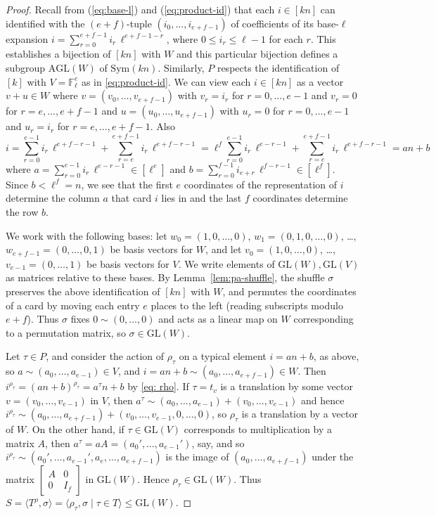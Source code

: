 \documentclass[12pt]{amsart}
\theoremstyle{remark}
\theoremstyle{definition}
\newcommand{\sym}{\mathrm{Sym}}
\newcommand{\GL}{\mathrm{GL}}
\newcommand{\AGL}{\mathrm{AGL}}
\begin{document}
\begin{proof}
Recall from (\ref{eq:base-l}) and (\ref{eq:product-id}) that each $i \in [kn]$ can identified with the $(e+f)$-tuple $(i_0, \ldots, i_{e+f-1})$ of coefficients of its base-$\ell$ expansion $i = \sum_{r=0}^{e+f-1} i_r\, \ell^{e+f-1-r}$, where $0 \leqslant i_r \leqslant \ell-1$ for each $r$. This establishes a bijection of $[kn]$ with $W$ and this particular bijection defines a subgroup $\AGL(W)$ of $\sym(kn)$. Similarly,  $P$ respects the identification of $[k]$ with $V=\mathbb F_\ell^e$ as in   \eqref{eq:product-id}. We can view each $i \in [kn]$ as a vector $v+u \in W$ where $v = (v_0, \dots,v_{e+f-1})$ with $v_r=i_r$ for $r=0,\dots,e-1$ and $v_r=0$ for $r=e,\dots,e+f-1$ and $u = (u_0, \dots, u_{e+f-1})$ with $u_r = 0$ for $r=0,\dots,e-1$ and $u_r=i_r$ for $r=e,\dots,e+f-1$. Also
	\[ 
	i = \sum_{r=0}^{e-1} i_r\, \ell^{e+f-r-1} + \sum_{r=e}^{e+f-1} i_r\, \ell^{e+f-r-1} = 
	\ell^f \sum_{r=0}^{e-1} i_r\, \ell^{e-r-1} + \sum_{r=e}^{e+f-1} i_r\, \ell^{e+f-r-1} = an + b 
	\]
where $a = \sum_{r=0}^{e-1} i_r\, \ell^{e-r-1}\in[\ell^e]$ and $b = \sum_{r=0}^{f-1} i_{e+r}\, \ell^{f-r-1} \in[\ell^f]$. Since $b < \ell^f = n$, we see that the first $e$ coordinates of the representation of $i$ determine the column $a$ that card $i$ lies in and the last $f$ coordinates determine the row $b$.

We work with the following bases: let $w_0 = (1,0,\dots,0)$, $w_1 = (0,1,0,\dots,0)$, \dots, $w_{e+f-1} = (0,\dots,0,1)$ be basis vectors for $W$, and let $v_0=(1,0,\dots,0)$, \dots, $v_{e-1}=(0,\dots,1)$  be basis vectors for  $V$. We write elements of $\GL(W), \GL(V)$ as matrices relative to these bases.
By Lemma~\ref{lem:pa-shuffle},   the shuffle  $\sigma$  preserves the above identification of $[kn]$ with $W$,  and permutes the coordinates of a card by moving each entry $e$ places to the left (reading subscripts modulo $e+f$). Thus  $\sigma$  fixes $0 \sim (0,\dots,0)$ and acts as a linear map on $W$ corresponding to a permutation matrix, so $\sigma \in \GL(W)$.

Let $\tau \in P$, and consider the action of $\rho_\tau$ on a typical element $i=an+b$, as above, so $a \sim (a_0,\dots,a_{e-1})\in V$, and $i=an+b \sim
(a_0,\dots,a_{e+f-1})\in W$.  Then   $i^{\rho_\tau} = (an+b)^{\rho_\tau} = a^{\tau}n+b$ by \eqref{eq: rho}.  
If $\tau=t_v$ is a translation by some vector $v=(v_0,\dots,v_{e-1})$ in $V$, then  $a^{\tau} \sim (a_0,\dots,a_{e-1})+(v_0,\dots,v_{e-1})$ and hence $i^{\rho_\tau} \sim (a_0,\dots,a_{e+f-1}) + (v_0,\dots,v_{e-1},0,\dots,0)$, so $\rho_\tau$ is a translation by a vector of $W$.
 On the other hand, if $\tau \in \GL(V)$ corresponds to multiplication by a matrix $A$, then $a^\tau = aA= (a_0',\dots,a_{e-1}')$, say, and so $i^{\rho_\tau} \sim (a_0',\dots,a_{e-1}',a_e,\dots,a_{e+f-1})$ is the image of $(a_0,\dots,a_{e+f-1})$ under the matrix $\left [ \begin{array}{cc} A & 0 \\ 0 & I_f \end{array}\right ]$ in $\GL(W)$. Hence $\rho_\tau \in \GL(W)$. Thus $S = \langle T^\rho,\sigma\rangle  = 
 \langle \rho_\tau, \sigma \mid \tau \in T \rangle \leqslant \GL(W)$.
 

\end{proof}
\end{document}
